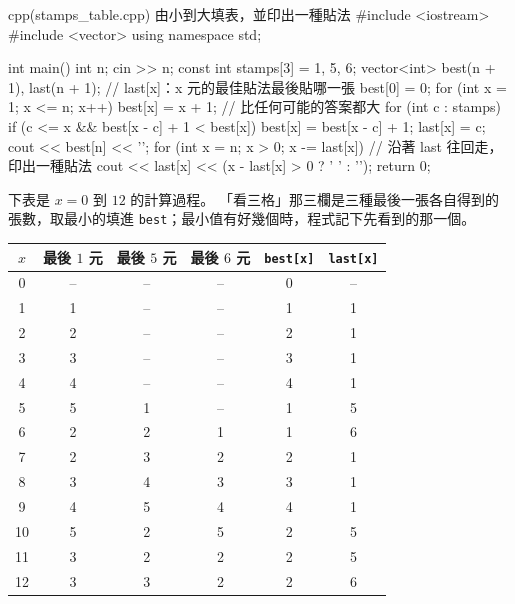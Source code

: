 \begin{example}[label=ex:stamps-table]{cpp}{(stamps\_table.cpp) 由小到大填表，並印出一種貼法}
#include <iostream>
#include <vector>
using namespace std;

int main() {
    int n;
    cin >> n;
    const int stamps[3] = {1, 5, 6};
    vector<int> best(n + 1), last(n + 1);   // last[x]：x 元的最佳貼法最後貼哪一張
    best[0] = 0;
    for (int x = 1; x <= n; x++) {
        best[x] = x + 1;                    // 比任何可能的答案都大
        for (int c : stamps) {
            if (c <= x && best[x - c] + 1 < best[x]) {
                best[x] = best[x - c] + 1;
                last[x] = c;
            }
        }
    }
    cout << best[n] << '\n';
    for (int x = n; x > 0; x -= last[x]) {  // 沿著 last 往回走，印出一種貼法
        cout << last[x] << (x - last[x] > 0 ? ' ' : '\n');
    }
    return 0;
}
\end{example}


下表是 $x = 0$ 到 $12$ 的計算過程。 「看三格」那三欄是三種最後一張各自得到的
張數，取最小的填進 \texttt{best}；最小值有好幾個時，程式記下先看到的那一個。

\begin{center}
\begin{tabular}{c|ccc|cc}
\toprule
$x$ & 最後 $1$ 元 & 最後 $5$ 元 & 最後 $6$ 元 & \texttt{best[x]} & \texttt{last[x]} \\
\midrule
0 & -- & -- & -- & 0 & -- \\
1 & 1 & -- & -- & 1 & 1 \\
2 & 2 & -- & -- & 2 & 1 \\
3 & 3 & -- & -- & 3 & 1 \\
4 & 4 & -- & -- & 4 & 1 \\
5 & 5 & 1 & -- & 1 & 5 \\
6 & 2 & 2 & 1 & 1 & 6 \\
7 & 2 & 3 & 2 & 2 & 1 \\
8 & 3 & 4 & 3 & 3 & 1 \\
9 & 4 & 5 & 4 & 4 & 1 \\
10 & 5 & 2 & 5 & 2 & 5 \\
11 & 3 & 2 & 2 & 2 & 5 \\
12 & 3 & 3 & 2 & 2 & 6 \\
\bottomrule
\end{tabular}
\end{center}

